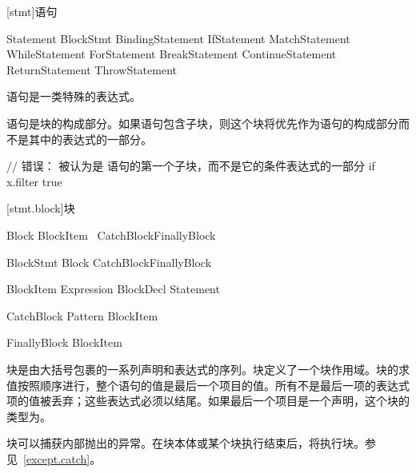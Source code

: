
[stmt]{语句}

\begin{bnf}{Statement}
    BlockStmt \br
    BindingStatement \br
    IfStatement \br
    MatchStatement \br
    WhileStatement \br
    ForStatement \br
    BreakStatement \br
    ContinueStatement \br
    ReturnStatement \br
    ThrowStatement
\end{bnf}

\pnum
语句是一类特殊的表达式。

\pnum
语句是块的构成部分。如果语句包含子块，则这个块将优先作为语句的构成部分而不是其中的表达式的一部分。\enterexample

\begin{codeblock}
// 错误：  被认为是  语句的第一个子块，而不是它的条件表达式的一部分
if x.filter{ true }
\end{codeblock}

\exitexample

[stmt.block]{块}

\begin{bnf}{Block}
    \terminal{\{} BlockItem\bnfs\ \terminal{\}} CatchBlock\bnfs FinallyBlock\bnfq
\end{bnf}

\begin{bnf}{BlockStmt}
    Block CatchBlock\bnfs FinallyBlock\bnfq
\end{bnf}

\begin{bnf}{BlockItem}
    Expression \terminal{;}\bnfq \br
    BlockDecl \br
    Statement
\end{bnf}

\begin{bnf}{CatchBlock}
     Pattern\bnfq \terminal{\{} BlockItem\bnfs\ \terminal{\}}
\end{bnf}

\begin{bnf}{FinallyBlock}
     \terminal{\{} BlockItem\bnfs\ \terminal{\}}
\end{bnf}

\pnum
块是由大括号包裹的一系列声明和表达式的序列。块定义了一个块作用域。块的求值按照顺序进行，整个语句的值是最后一个项目的值。所有不是最后一项的表达式项的值被丢弃；这些表达式必须以\tcode{;}结尾。如果最后一个项目是一个声明，这个块的类型为。

\pnum
{}块可以捕获内部抛出的异常。在块本体或某个块执行结束后，将执行块。参见~\ref{except.catch}。

